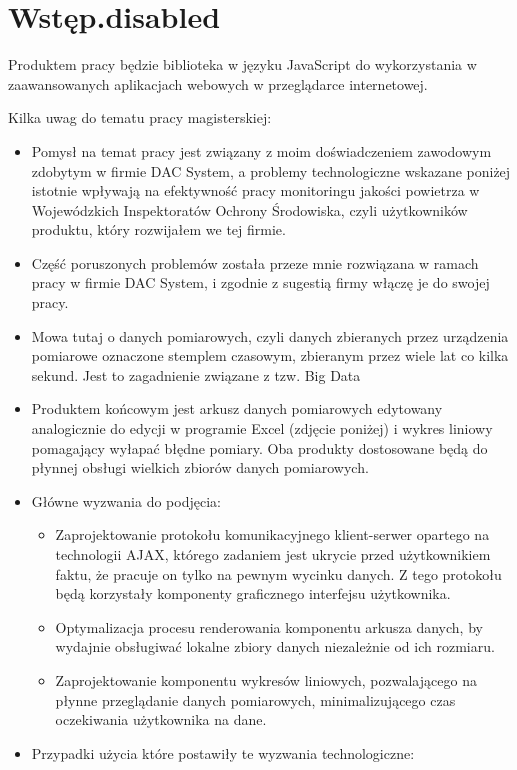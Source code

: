
\chapter{Wst\k{e}p.disabled}

Produktem pracy będzie biblioteka w języku JavaScript do wykorzystania w zaawansowanych aplikacjach webowych w przeglądarce internetowej.


Kilka uwag do tematu pracy magisterskiej:
\begin{itemize}
	\item Pomysł na temat pracy jest związany z moim doświadczeniem zawodowym zdobytym w firmie DAC System, a problemy technologiczne wskazane poniżej istotnie wpływają na efektywność pracy monitoringu jakości powietrza w Wojewódzkich Inspektoratów Ochrony Środowiska, czyli użytkowników produktu, który rozwijałem we tej firmie.
	\item Część poruszonych problemów została przeze mnie rozwiązana w ramach pracy w firmie DAC System, i zgodnie z sugestią firmy włączę je do swojej pracy.
	\item Mowa tutaj o danych pomiarowych, czyli danych zbieranych przez urządzenia pomiarowe oznaczone stemplem czasowym, zbieranym przez wiele lat co kilka sekund. Jest to zagadnienie związane z tzw. Big Data
	\item Produktem końcowym jest arkusz danych pomiarowych edytowany analogicznie do edycji w programie Excel (zdjęcie poniżej) i wykres liniowy pomagający wyłapać błędne pomiary. Oba produkty dostosowane będą do płynnej obsługi wielkich zbiorów danych pomiarowych.
	\item Główne wyzwania do podjęcia:
		\begin{itemize}
			\item Zaprojektowanie protokołu komunikacyjnego klient-serwer opartego na technologii AJAX, którego zadaniem jest ukrycie przed użytkownikiem faktu, że pracuje on tylko na pewnym wycinku danych. Z tego protokołu będą korzystały komponenty graficznego interfejsu użytkownika.
			\item Optymalizacja procesu renderowania komponentu arkusza danych, by wydajnie obsługiwać lokalne zbiory danych niezależnie od ich rozmiaru.
			\item Zaprojektowanie komponentu wykresów liniowych, pozwalającego na płynne przeglądanie danych pomiarowych, minimalizującego czas oczekiwania użytkownika na dane.
		\end{itemize}
	\item Przypadki użycia które postawiły te wyzwania technologiczne:

\end{itemize}
